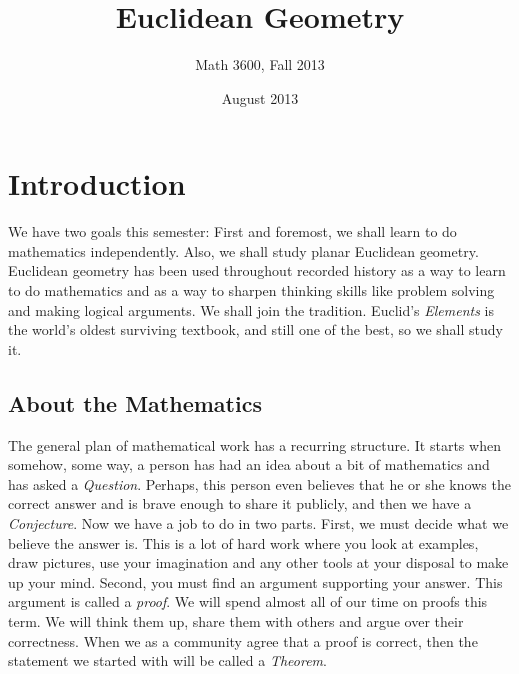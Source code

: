\documentclass{tufte-handout}
\title{Euclidean Geometry}
\author[Math 3600]{Math 3600, Fall 2013}
\date{August 2013}
\theoremstyle{definition}
\begin{document}
\maketitle

\section*{Introduction}

We have two goals this semester: 
First and foremost, we shall learn to do mathematics independently. 
Also, we shall study planar Euclidean geometry. 
Euclidean geometry has been used throughout recorded history as a way to learn to do mathematics and as a way to sharpen thinking skills like problem solving and making logical arguments. 
We shall join the tradition. 
Euclid's \emph{Elements} is the world's oldest surviving textbook, and still one of the best, so we shall study it.

\subsection*{About the Mathematics}
The general plan of mathematical work has a recurring structure. It starts when somehow, some way, a person has had an idea about a bit of mathematics and has asked a \emph{Question}. Perhaps, this person even believes that he or she knows the correct answer and is brave enough to share it publicly, and then we have a \emph{Conjecture}.
Now we have a job to do in two parts. First, we must decide what we believe the answer is. This is a lot of hard work where you look at examples, draw pictures, use your imagination and any other tools at your disposal to make up your mind. Second, you must find an argument supporting your answer. This argument is called a \emph{proof}. We will spend almost all of our time on proofs this term. We will think them up, share them with others and argue over their correctness. When we as a community agree that a proof is correct, then the statement we started with will be called a \emph{Theorem}.
\end{document}
